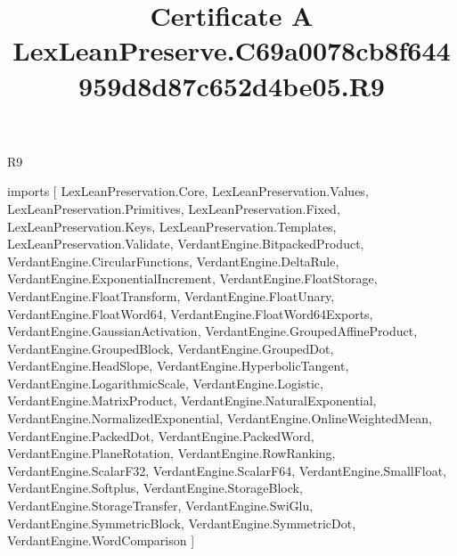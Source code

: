\begin{lexlean}{R9}
\title{Certificate A LexLeanPreserve.C69a0078cb8f644959d8d87c652d4be05.R9}
\begin{coremodule}
imports [
  LexLeanPreservation.Core,
  LexLeanPreservation.Values,
  LexLeanPreservation.Primitives,
  LexLeanPreservation.Fixed,
  LexLeanPreservation.Keys,
  LexLeanPreservation.Templates,
  LexLeanPreservation.Validate,
  VerdantEngine.BitpackedProduct,
  VerdantEngine.CircularFunctions,
  VerdantEngine.DeltaRule,
  VerdantEngine.ExponentialIncrement,
  VerdantEngine.FloatStorage,
  VerdantEngine.FloatTransform,
  VerdantEngine.FloatUnary,
  VerdantEngine.FloatWord64,
  VerdantEngine.FloatWord64Exports,
  VerdantEngine.GaussianActivation,
  VerdantEngine.GroupedAffineProduct,
  VerdantEngine.GroupedBlock,
  VerdantEngine.GroupedDot,
  VerdantEngine.HeadSlope,
  VerdantEngine.HyperbolicTangent,
  VerdantEngine.LogarithmicScale,
  VerdantEngine.Logistic,
  VerdantEngine.MatrixProduct,
  VerdantEngine.NaturalExponential,
  VerdantEngine.NormalizedExponential,
  VerdantEngine.OnlineWeightedMean,
  VerdantEngine.PackedDot,
  VerdantEngine.PackedWord,
  VerdantEngine.PlaneRotation,
  VerdantEngine.RowRanking,
  VerdantEngine.ScalarF32,
  VerdantEngine.ScalarF64,
  VerdantEngine.SmallFloat,
  VerdantEngine.Softplus,
  VerdantEngine.StorageBlock,
  VerdantEngine.StorageTransfer,
  VerdantEngine.SwiGlu,
  VerdantEngine.SymmetricBlock,
  VerdantEngine.SymmetricDot,
  VerdantEngine.WordComparison
]


\end{coremodule}
\end{lexlean}
